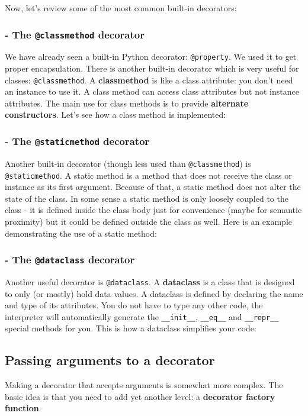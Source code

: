 \bigskip

Now, let's review some of the most common built-in decorators:

\subsubsection{- The \texttt{@classmethod} decorator}
We have already seen a built-in Python decorator: \texttt{@property}. We used it to get proper encapsulation. There is another built-in decorator which is very useful for classes: \texttt{@classmethod}. A \textbf{classmethod} is like a class attribute: you don't need an instance to use it. A class method can access class attributes but not instance attributes. The main use for class methods is to provide \textbf{alternate constructors}. Let's see how a class method is implemented:



\subsubsection{- The \texttt{@staticmethod} decorator}
Another built-in decorator (though less used than \texttt{@classmethod}) is \texttt{@staticmethod}. A static method is a method that does not receive the class or instance as its first argument. Because of that, a static method does not alter the state of the class. In some sense a static method is only loosely coupled to the class - it is defined inside the class body just for convenience (maybe for semantic proximity) but it could be defined outside the class as well. Here is an example demonstrating the use of a static method:



\subsubsection{- The \texttt{@dataclass} decorator}
Another useful decorator is \texttt{@dataclass}. A \textbf{dataclass} is a class that is designed to only (or mostly) hold data values. A dataclass is defined by declaring the name and type of its attributes. You do not have to type any other code, the interpreter will automatically generate the \texttt{\_\_init\_\_}, \texttt{\_\_eq\_\_} and \texttt{\_\_repr\_\_} special methods for you. This is how a dataclass simplifies your code:



\subsection{Passing arguments to a decorator}
Making a decorator that accepts arguments is somewhat more complex. The basic idea is that you need to add yet another level: a \textbf{decorator factory function}.

